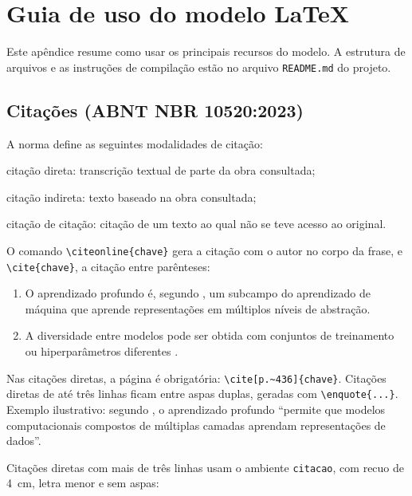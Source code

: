 \chapter{Guia de uso do modelo LaTeX}
\label{apA_guia}


Este apêndice resume como usar os principais recursos do modelo. A estrutura de arquivos e as instruções de compilação estão no arquivo \texttt{README.md} do projeto.

\section{Citações (ABNT NBR 10520:2023)}

A norma define as seguintes modalidades de citação:

\begin{alineas}
	\item citação direta: transcrição textual de parte da obra consultada;
	\item citação indireta: texto baseado na obra consultada;
	\item citação de citação: citação de um texto ao qual não se teve acesso ao original.
\end{alineas}

O comando \verb|\citeonline{chave}| gera a citação com o autor no corpo da frase, e \verb|\cite{chave}|, a citação entre parênteses:

\begin{enumerate}
	\item O aprendizado profundo é, segundo , um subcampo do aprendizado de máquina que aprende representações em múltiplos níveis de abstração.
	\item A diversidade entre modelos pode ser obtida com conjuntos de treinamento ou hiperparâmetros diferentes \cite{Polikar2012EnsembleLearning}.
\end{enumerate}

Nas citações diretas, a página é obrigatória: \verb|\cite[p.~436]{chave}|. Citações diretas de até três linhas ficam entre aspas duplas, geradas com \verb|\enquote{...}|. Exemplo ilustrativo: segundo , o aprendizado profundo \enquote{permite que modelos computacionais compostos de múltiplas camadas aprendam representações de dados}.

Citações diretas com mais de três linhas usam o ambiente \texttt{citacao}, com recuo de 4~cm, letra menor e sem aspas:

